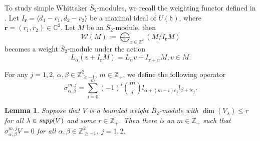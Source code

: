 \documentclass[12pt,a4paper]{amsart}
\newtheorem{Lemma}[Theorem]{Lemma}
\def\br{\mathbf{r}}
\begin{document}
To study simple Whittaker $\bar{S}_2$-modules, we recall the weighting functor defined in \cite{N}. Let $I_{\br}=\langle d_1-r_1, d_2-r_2\rangle$ be a maximal ideal of $U(\mathfrak{h})$, where $\br=(r_1,r_2)\in \mathbb{C}^{2}$. Let $M$ be an $\bar{S}_2$-module, then
$$\mathcal{W}(M):=\bigoplus_{\br\in \mathbb{Z}^{2}}(M/I_{\br}M)$$
becomes a weight $\bar{S}_2$-module under the action
$$L_{\alpha}(v+I_{\br}M)=L_{\alpha}v+I_{\br+\alpha}M, v\in M.$$


For any $j=1,2$, $\alpha, \beta \in \mathbb{Z}^{2}_{\geq -1}$, $m\in\mathbb{Z}_{+}$, we define the following  operator
$$\sigma^{m,j}_{\alpha,\beta}=\sum^{m}_{i=0}(-1)^{i} \binom{m}{i} l_{\alpha+(m-i)e_{j}} l_{\beta+ie_{j}}.$$


\begin{Lemma}\label{bound}\emph{\cite{HL1}}
Suppose that $V$ is a bounded weight $\bar{B}_2$-module with $\dim(V_{\lambda})\leq r$ for all $\lambda\in \emph{supp}(V)$ and some $r\in \mathbb{Z}_{+}$. Then there is an $m\in \mathbb{Z}_{+}$ such that $\sigma^{m,j}_{\alpha,\beta}V=0$ for all $\alpha,\beta \in \mathbb{Z}^{2}_{\geq -1}$, $j=1,2$.
\end{Lemma}
\end{document}
